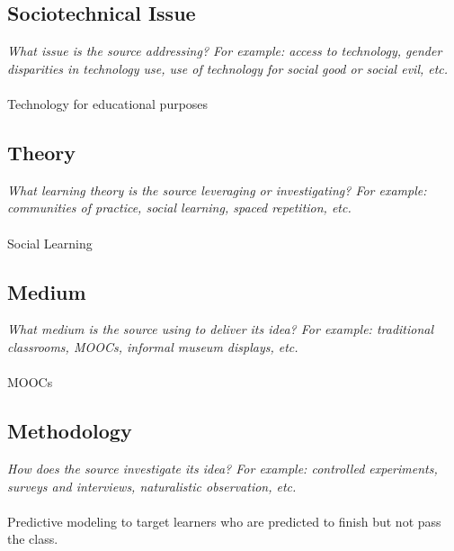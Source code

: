 \documentclass[12pt, final]{article}
\begin{document}
\subsection{Sociotechnical Issue}
\textit{What issue is the source addressing? For example: access to technology, gender disparities in technology use, use of technology for social good or social evil, etc.}
\\
\\
Technology for educational purposes

\subsection{Theory}
\textit{What learning theory is the source leveraging or investigating? For example: communities of practice, social learning, spaced repetition, etc.}
\\
\\
Social Learning

\subsection{Medium}
\textit{What medium is the source using to deliver its idea? For example: traditional classrooms, MOOCs, informal museum displays, etc.}
\\
\\
MOOCs

\subsection{Methodology}
\textit{How does the source investigate its idea? For example: controlled experiments, surveys and interviews, naturalistic observation, etc.}
\\
\\
Predictive modeling to target learners who are predicted to finish but not pass the class.
\end{document}
